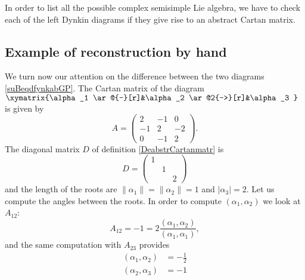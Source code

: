 In order to list all the possible complex semisimple Lie algebra, we have to check each of the left Dynkin diagrams if they give rise to an abstract Cartan matrix.



\subsection{Example of reconstruction by hand}
\label{subsecRecbyhanfd}

We turn now our attention on the difference between the two diagrams \eqref{suBeqdfynkabGP}. The Cartan matrix of the diagram $
        \xymatrix{%
        \alpha_1 \ar@{-}[r]&\alpha_2 \ar@2{->}[r]&\alpha_3
        }   $ is given by
        \begin{equation}
        A=\begin{pmatrix}
            2    &   -1    &   0    \\
            -1    &   2    &   -2    \\
            0    &   -1    &   2
       \end{pmatrix}.
        \end{equation}
The diagonal matrix \( D\) of definition \ref{DeabstrCartanmatr} is
\begin{equation}
    D=\begin{pmatrix}
        1    &       &       \\
            &   1    &       \\
            &       &   2
    \end{pmatrix}
\end{equation}
and the length of the roots are \( \| \alpha_1 \|=\| \alpha_2 \|=1\) and \( | \alpha_3 |=2\). Let us compute the angles between the roots. In order to compute \( (\alpha_1,\alpha_2)\) we look at \( A_{12}\):
\begin{equation}
    A_{12}=-1=2\frac{ (\alpha_1,\alpha_2) }{ (\alpha_1,\alpha_1) },
\end{equation}
and the same computation with \( A_{23}\) provides
\begin{subequations}
    \begin{align}
        (\alpha_1,\alpha_2)&=-\frac{ 1 }{2}\\
        (\alpha_2,\alpha_3)&=-1
    \end{align}
\end{subequations}
